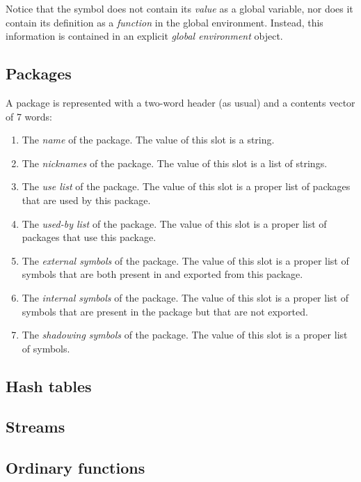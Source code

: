 Notice that the symbol does not contain its \emph{value} as a global
variable, nor does it contain its definition as a \emph{function} in
the global environment.  Instead, this information is contained in an
explicit \emph{global environment} object.

\subsection{Packages}

A package is represented with a two-word header (as usual) and a
contents vector of 7 words:

\begin{enumerate}
\item The \emph{name} of the package.  The value of this slot is a
  string.
\item The \emph{nicknames} of the package.  The value of this slot is
  a list of strings. 
\item The \emph{use list} of the package.  The value of this slot is a
  proper list of packages that are used by this package. 
\item The \emph{used-by list} of the package.  The value of this slot
is a proper list of packages that use this package. 
\item The \emph{external symbols} of the package.  The value of this
  slot is a proper list of symbols that are both present in and
  exported from this package.
\item The \emph{internal symbols} of the package.  The value of this
  slot is a proper list of symbols that are present in the package but
  that are not exported.
\item The \emph{shadowing symbols} of the package.  The value of this
  slot is a proper list of symbols. 
\end{enumerate}

\subsection{Hash tables}

\subsection{Streams}

\subsection{Ordinary functions}

